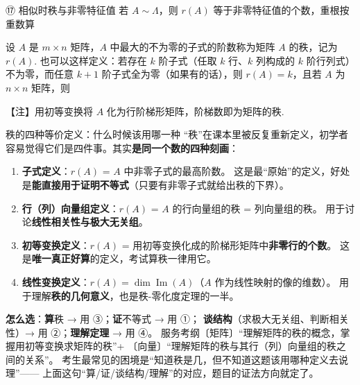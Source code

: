 \begin{fcard}{⑰ 相似时秩与非零特征值}
若 $A\sim\Lambda$，则 $r(A)$ 等于非零特征值的个数，重根按重数算
\end{fcard}



设 $A$ 是 $m\times n$ 矩阵，$A$ 中最大的不为零的子式的阶数称为矩阵 $A$ 的秩，记为 $r(A)$. 也可以这样定义：若存在 $k$ 阶子式（任取 $k$ 行、$k$ 列构成的 $k$ 阶行列式）不为零，而任意 $k+1$ 阶子式全为零（如果有的话），则 $r(A)=k$，且若 $A$ 为 $n\times n$ 矩阵，则

\begin{fnote}
【注】用初等变换将 $A$ 化为行阶梯形矩阵，阶梯数即为矩阵的秩.
\end{fnote}


\begin{fdeep}{秩的四种等价定义：什么时候该用哪一种}
“秩”在课本里被反复重新定义，初学者容易觉得它们是四件事。其实\textbf{是同一个数的四种刻画}：
\begin{enumerate}[leftmargin=2.2em,itemsep=0.25em]
\item \textbf{子式定义}：$r(A)$ = $A$ 中非零子式的最高阶数。
      这是最“原始”的定义，好处是\textbf{能直接用于证明不等式}（只要有非零子式就给出秩的下界）。
\item \textbf{行（列）向量组定义}：$r(A)$ = $A$ 的行向量组的秩 = 列向量组的秩。
      用于讨论\textbf{线性相关性与极大无关组}。
\item \textbf{初等变换定义}：$r(A)$ = 用初等变换化成的阶梯形矩阵中\textbf{非零行的个数}。
      这是\textbf{唯一真正好算}的定义，考试算秩一律用它。
\item \textbf{线性变换定义}：$r(A)=\dim\operatorname{Im}(A)$（$A$ 作为线性映射的像的维数）。
      用于理解\textbf{秩的几何意义}，也是秩-零化度定理的一半。
\end{enumerate}
\textbf{怎么选}：\textbf{算}秩 → 用 ③；\textbf{证}不等式 → 用 ①；
\textbf{谈结构}（求极大无关组、判断相关性）→ 用 ②；\textbf{理解定理} → 用 ④。
\fbref{}服务考纲〔矩阵〕“理解矩阵的秩的概念，掌握用初等变换求矩阵的秩”+
〔向量〕“理解矩阵的秩与其行（列）向量组的秩之间的关系”。
考生最常见的困境是“知道秩是几，但不知道这题该用哪种定义去说理”——
上面这句“算/证/谈结构/理解”的对应，题目的证法方向就定了。
\end{fdeep}

